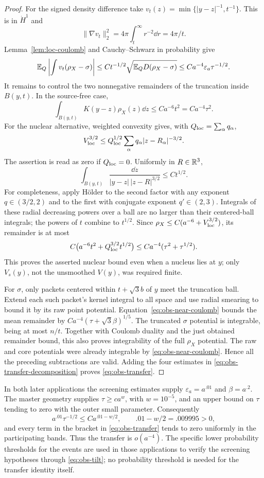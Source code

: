 \begin{proof}
For the signed density difference take
$v_t(z)=\min\{|y-z|^{-1},t^{-1}\}$. This is in $\dot H^1$ and
\[
 \|\nabla v_t\|_2^2=4\pi\int_t^\infty r^{-2}\dd r=4\pi/t.
\]
Lemma~\ref{lem:loc-coulomb} and Cauchy--Schwarz in probability give
\[
 \mathbb E_Q\left|\int v_t(\rho_X-\sigma)\right|
   \le Ct^{-1/2}\sqrt{\mathbb E_QD(\rho_X-\sigma)}
   \le Ca^{-4}\varepsilon_a\tau^{-1/2}.
\]
It remains to control the two nonnegative remainders of the
truncation inside $B(y,t)$. In the source-free case,
\[
 \int_{B(y,t)}K(y-z)\rho_X(z)\dd z
                         \le Ca^{-6}t^2=Ca^{-4}\tau^2.
\]
For the nuclear alternative, weighted convexity gives, with
$Q_{\rm loc}=\sum_\alpha q_\alpha$,
\[
 V_{\rm loc}^{3/2}
   \le Q_{\rm loc}^{1/2}\sum_\alpha
                           q_\alpha|z-R_\alpha|^{-3/2}.
\]
The assertion is read as zero if $Q_{\rm loc}=0$. Uniformly in
$R\in\mathbb R^3$,
\[
 \int_{B(y,t)}\frac{\dd z}{|y-z|\,|z-R|^{3/2}}
                                                  \le Ct^{1/2}.
\]
For completeness, apply H\"older to the second factor with any
exponent $q\in(3/2,2)$ and to the first with conjugate exponent
$q'\in(2,3)$. Integrals of these radial decreasing powers over a
ball are no larger than their centered-ball integrals; the powers
of $t$ combine to $t^{1/2}$. Since
$\rho_X\le C(a^{-6}+V_{\rm loc}^{3/2})$, its remainder is at most
\[
 C\big(a^{-6}t^2+Q_{\rm loc}^{3/2}t^{1/2}\big)
                    \le Ca^{-4}(\tau^2+\tau^{1/2}).
\]
This proves the asserted nuclear bound even when a nucleus lies at
$y$; only $V_s(y)$, not the unsmoothed $V(y)$, was required finite.

For $\sigma$, only packets centered within $t+\sqrt3b$ of $y$
meet the truncation ball. Extend each such packet's kernel integral
to all space and use radial smearing to bound it by its raw point
potential. Equation~\eqref{eq:obs-near-coulomb} bounds the mean
remainder by $Ca^{-4}(\tau+\sqrt3\beta)^{1/5}$. The truncated
$\sigma$ potential is integrable, being at most $n/t$. Together
with Coulomb duality and the just obtained remainder bound, this
also proves integrability of the full $\rho_X$ potential. The
raw and core potentials were already integrable by
\eqref{eq:obs-near-coulomb}. Hence all the preceding subtractions
are valid. Adding the four estimates in
\eqref{eq:obs-transfer-decomposition} proves \eqref{eq:obs-transfer}.
\end{proof}

In both later applications the screening estimates supply
$\varepsilon_a=a^{.01}$ and $\beta=a^{.2}$. The master geometry
supplies $\tau\ge ca^w$, with $w=10^{-5}$, and an upper bound on
$\tau$ tending to zero with the outer small parameter. Consequently
\[
 a^{.01}\tau^{-1/2}\le Ca^{.01-w/2},\qquad
 .01-w/2=.009995>0,
\]
and every term in the bracket in \eqref{eq:obs-transfer} tends to
zero uniformly in the participating bands. Thus the transfer is
$o(a^{-4})$. The specific lower probability thresholds for the
events are used in those applications to verify the screening
hypotheses through \eqref{eq:obs-tilt}; no probability threshold is
needed for the transfer identity itself.
